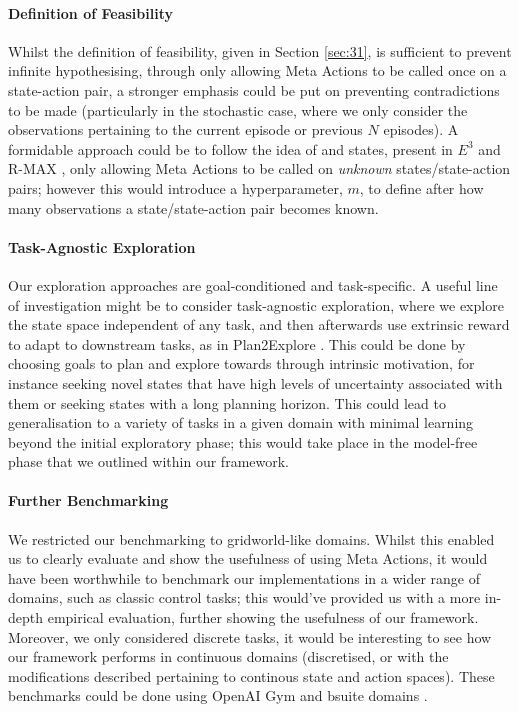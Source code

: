 \paragraph*{Definition of Feasibility}
Whilst the definition of feasibility, given in Section \ref{sec:31}, is sufficient to prevent infinite hypothesising, through only allowing Meta Actions to be called once on a state-action pair, a stronger emphasis could be put on preventing contradictions to be made (particularly in the stochastic case, where we only consider the observations pertaining to the current episode or previous $N$ episodes). A formidable approach could be to follow the idea of  and  states, present in $E^3$ \cite{Kearns+Singh:2002} and R-MAX \cite{10.1162/153244303765208377}, only allowing Meta Actions to be called on \textit{unknown} states/state-action pairs; however this would introduce a hyperparameter, $m$, to define after how many observations a state/state-action pair becomes known.
\paragraph*{Task-Agnostic Exploration}

Our exploration approaches are goal-conditioned and task-specific. A useful line of investigation might be to consider task-agnostic exploration, where we explore the state space independent of any task, and then afterwards use extrinsic reward to adapt to downstream tasks, as in Plan2Explore \cite{plan2explore}. This could be done by choosing goals to plan and explore towards through intrinsic motivation, for instance seeking novel states that have high levels of uncertainty associated with them or seeking states with a long planning horizon. This could lead to generalisation to a variety of tasks in a given domain with minimal learning beyond the initial exploratory phase; this would take place in the model-free phase that we outlined within our framework.

\paragraph*{Further Benchmarking}
We restricted our benchmarking to gridworld-like domains. Whilst this enabled us to clearly evaluate and show the usefulness of using Meta Actions, it would have been worthwhile to benchmark our implementations in a wider range of domains, such as classic control tasks; this would've provided us with a more in-depth empirical evaluation, further showing the usefulness of our framework. Moreover, we only considered discrete tasks, it would be interesting to see how our framework performs in continuous domains (discretised, or with the modifications described pertaining to continous state and action spaces). These benchmarks could be done using OpenAI Gym \cite{1606.01540} and bsuite domains \cite{osband2020bsuite}.

